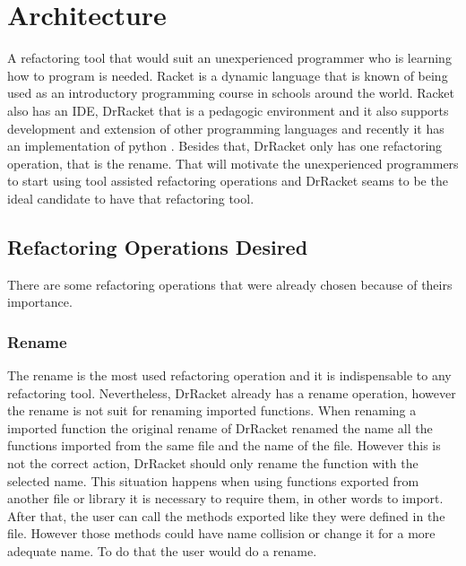 
% 
% 

\section{Architecture}


A refactoring tool that would suit an unexperienced programmer who is learning how to program is needed. 
Racket is a dynamic language that is known of being used as an introductory programming course in schools around the world. 
Racket also has an IDE, DrRacket that is a pedagogic environment \cite{drscheme_pegadogy} and it also supports development and extension of other programming languages \cite{tobin2011languages} and recently it has an implementation of python \cite{ramos2014implementation}.
Besides that, DrRacket only has one refactoring operation, that is the rename.
That will motivate the unexperienced programmers to start using tool assisted refactoring operations and DrRacket seams to be the ideal candidate to have that refactoring tool.


\subsection{Refactoring Operations Desired}
There are some refactoring operations that were already chosen because of theirs importance.

\subsubsection{Rename}
The rename is the most used refactoring operation and it is indispensable to any refactoring tool.
Nevertheless, DrRacket already has a rename operation, however the rename is not suit for renaming imported functions.
When renaming a imported function the original rename of DrRacket renamed the name all the functions imported from the same file and the name of the file. However this is not the correct action, DrRacket should only rename the function with the selected name.
This situation happens when using functions exported from another file or library it is necessary to require them, in other words to import.
After that, the user can call the methods exported like they were defined in the file.
However those methods could have name collision or change it for a more adequate name. To do that the user would do a rename.



